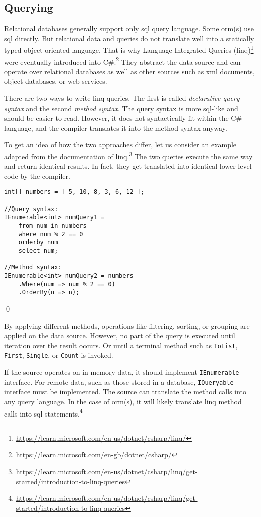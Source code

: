 \subsection{Querying}\label{sec:queries}
Relational databases generally support only \acrshort{sql} query language. Some \acrshort{orm}(s) use \acrshort{sql} directly. But relational data and queries do not translate well into a statically typed object-oriented language. That is why Language Integrated Queries (\acrshort{linq})\footnote{\url{https://learn.microsoft.com/en-us/dotnet/csharp/linq/}} were eventually introduced into C\#.\footnote{\url{https://learn.microsoft.com/en-gb/dotnet/csharp/}} They abstract the data source and can operate over relational databases as well as other sources such as \acrshort{xml} documents, object databases, or web services.

There are two ways to write \acrshort{linq} queries. The first is called \textit{declarative query syntax} and the second \textit{method syntax}. The query syntax is more \acrshort{sql}-like and should be easier to read. However, it does not syntactically fit within the C\# language, and the compiler translates it into the method syntax anyway.

\begin{example}
\small
To get an idea of how the two approaches differ, let us consider an example adapted from the documentation of \acrshort{linq}.\footnote{\url{https://learn.microsoft.com/en-us/dotnet/csharp/linq/get-started/introduction-to-linq-queries}} The two queries execute the same way and return identical results. In fact, they get translated into identical lower-level code by the compiler.

\begin{lstlisting}[language=CSharp]
int[] numbers = [ 5, 10, 8, 3, 6, 12 ];

//Query syntax:
IEnumerable<int> numQuery1 =
    from num in numbers
    where num % 2 == 0
    orderby num
    select num;

//Method syntax:
IEnumerable<int> numQuery2 = numbers
    .Where(num => num % 2 == 0)
    .OrderBy(n => n);
\end{lstlisting}
\qed
\end{example}

By applying different methods, operations like filtering, sorting, or grouping are applied on the data source. However, no part of the query is executed until iteration over the result occurs. Or until a terminal method such as \texttt{ToList}, \texttt{First}, \texttt{Single}, or \texttt{Count} is invoked. 

If the source operates on in-memory data, it should implement \texttt{IEnumerable} interface. For remote data, such as those stored in a database, \texttt{IQueryable} interface must be implemented. The source can translate the method calls into any query language. In the case of \acrshort{orm}(s), it will likely translate \acrshort{linq} method calls into \acrshort{sql} statements.\footnote{\url{https://learn.microsoft.com/en-us/dotnet/csharp/linq/get-started/introduction-to-linq-queries}}